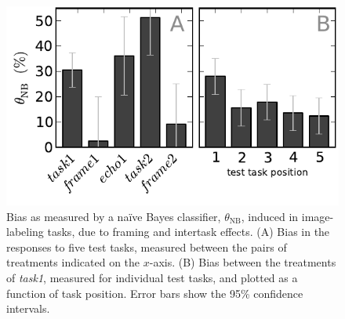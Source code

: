 \documentclass[12pt]{article}
\begin{document}
\begin{figure}
	\centering
	\includegraphics[scale=1]{figs/theta.pdf}
	\caption{
		Bias as measured by a na\"ive Bayes classifier, $\theta_\mathrm{NB}$,
		induced in image-labeling tasks, due to framing and 
		intertask effects. 
		(A) Bias in the responses to five test tasks,
		measured between the pairs of treatments indicated on the $x$-axis.  
		(B) Bias between the treatments of \textit{task1}, 
		measured for individual test tasks, and plotted as a function of 
		task position.  Error bars show the 95\% confidence intervals.
	}
	\label{fig:theta}
\end{figure}
\end{document}
